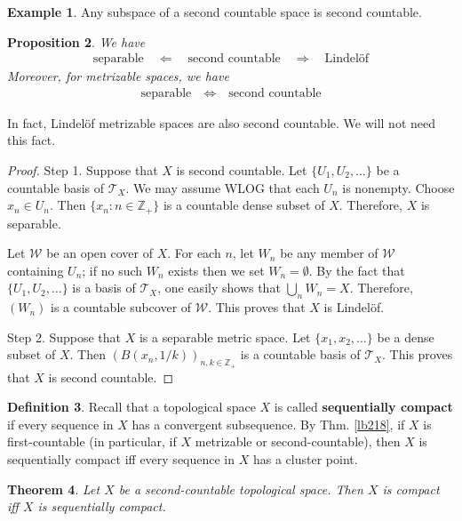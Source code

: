 \documentclass[12pt,b5paper,notitlepage]{article}
\theoremstyle{definition}
\newtheorem{df}{Definition}[subsection]
\newtheorem{eg}[df]{Example}
\theoremstyle{plain}
\newtheorem{thm}[df]{Theorem}
\newtheorem{pp}[df]{Proposition}
\newcommand{\Zbb}{\mathbb Z}
\newcommand{\MW}{\mathcal W}
\newcommand{\MT}{\mathcal T}
\numberwithin{equation}{section}
\begin{document}
\begin{eg}
Any subspace of a second countable space is second countable.
\end{eg}


\begin{pp}\label{lb220}
We have
\begin{align*}
\text{separable}\quad\Longleftarrow\quad\text{second countable}\quad\Longrightarrow\quad\text{Lindel\"of}
\end{align*}
Moreover, for metrizable spaces, we have
\begin{align*}
\text{separable}\quad\Longleftrightarrow\quad\text{second countable}
\end{align*}
\end{pp}

In fact, Lindel\"of metrizable spaces are also second countable. We will not need this fact.

\begin{proof}
Step 1. Suppose that $X$ is second countable. Let $\{U_1,U_2,\dots\}$ be a countable basis of $\MT_X$. We may assume WLOG that each $U_n$ is nonempty. Choose $x_n\in U_n$. Then $\{x_n:n\in\Zbb_+\}$ is a countable dense subset of $X$. Therefore, $X$ is separable. 

Let $\MW$ be an open cover of $X$. For each $n$, let $W_n$ be any member of $\MW$ containing $U_n$; if no such $W_n$ exists then we set $W_n=\emptyset$. By the fact that $\{U_1,U_2,\dots\}$ is a basis of $\MT_X$, one easily shows that $\bigcup_nW_n=X$. Therefore, $(W_n)$ is a countable subcover of $\MW$. This proves that $X$ is Lindel\"of.

Step 2. Suppose that $X$ is a separable metric space. Let $\{x_1,x_2,\dots\}$ be a dense subset of $X$. Then $(B(x_n,1/k))_{n,k\in\Zbb_+}$ is a countable basis of $\MT_X$. This proves that $X$ is second countable.
\end{proof}



\begin{df}
Recall that a topological space $X$ is called \textbf{sequentially compact}  if every sequence in $X$ has a convergent subsequence. By Thm. \ref{lb218}, if $X$ is first-countable (in particular, if $X$ metrizable or second-countable), then $X$ is sequentially compact iff every sequence in $X$ has a cluster point.
\end{df}


\begin{thm}\label{lb219}
Let $X$ be a second-countable topological space. Then $X$ is compact iff $X$ is sequentially compact.
\end{thm}
\end{document}
